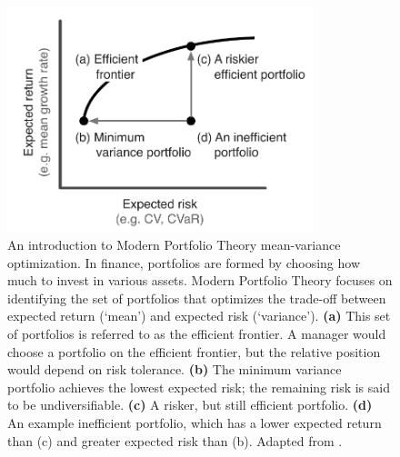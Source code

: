\begin{figure}[htbp]
\centering \includegraphics[width=3.5in]{efficient-frontier-fig.pdf}
\caption{An introduction to Modern Portfolio Theory mean-variance optimization.
  In finance, portfolios are formed by choosing how much to invest in various
  assets. Modern Portfolio Theory focuses on identifying the set of portfolios
  that optimizes the trade-off between expected return (`mean') and expected
  risk (`variance'). \textbf{(a)} This set of portfolios is referred to as the
  efficient frontier. A manager would choose a portfolio on the efficient
  frontier, but the relative position would depend on risk tolerance.
  \textbf{(b)} The minimum variance portfolio achieves the lowest expected
  risk; the remaining risk is said to be undiversifiable. \textbf{(c)} A
  risker, but still efficient portfolio. \textbf{(d)} An example inefficient
  portfolio, which has a lower expected return than (c) and greater expected
  risk than (b). Adapted from \citet{hoekstra2012}.} \label{fig:mpt}
\end{figure}

\clearpage


